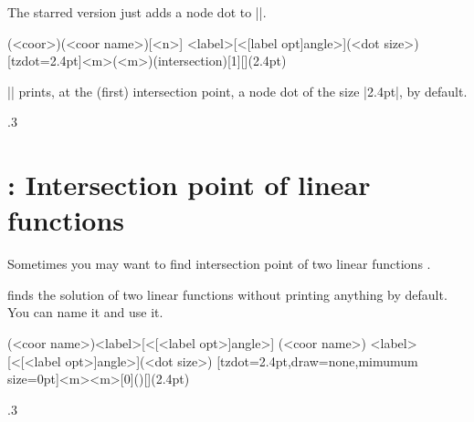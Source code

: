 The starred version \icmd{\tzhXpoint*} just adds a node dot to |\tzhXpoint|.

\begin{tzdef}{}
(<coor>)(<coor name>)[<n>]
           {<label>}[<[label opt]angle>](<dot size>)
  [tzdot=2.4pt]{<m>}(<m>)(intersection)[1]{}[](2.4pt)
\end{tzdef}

|\tzhXpoint*| prints, at the (first) intersection point, a node dot of the size |2.4pt|, by default.

\begin{tzcode}{.3}
\end{tzcode}


\section{\protect\cmd{\tzLFnXpoint(*)}: Intersection point of linear functions}
\label{s:tzLFnXpoint}

Sometimes you may want to  find intersection point of two linear functions .

\icmd{\tzLFnXpoint} finds the solution of two linear functions without printing anything by default.
You can name it and use it.

\begin{tzdef}{}
\tzLFnXpoint{<\fn>}{<\fn>}
\tzLFnXpoint{<\fn>}{<\fn>}(<coor name>){<label>}[<[<label opt>]angle>]
\tzLFnXpoint[<opt>]{<\fn>}{<\fn>}(<coor name>)
            {<label>}[<[<label opt>]angle>](<dot size>)
  [tzdot=2.4pt,draw=none,mimumum size=0pt]{<m>}{<m>}[0](){}[](2.4pt)
\end{tzdef}


\begin{tzcode}{.3}
\end{tzcode}

